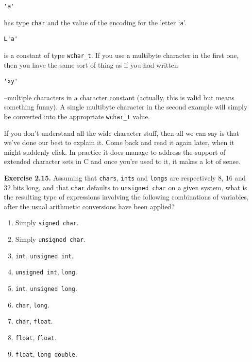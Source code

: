     \begin{Verbatim}
'a'
\end{Verbatim}

    has type \texttt{char} and the value of the encoding for the
     letter `\texttt{a}'.


    \begin{Verbatim}
L'a'
\end{Verbatim}

    is a constant of type \texttt{wchar\_t}. If you use a multibyte
     character in the first one, then you have the same sort of thing as if
     you had written


    \begin{Verbatim}
'xy'
\end{Verbatim}

    --multiple characters in a character constant (actually, this is
     valid but means something funny). A single multibyte character in the
     second example will simply be converted into the appropriate
     \texttt{wchar\_t} value.


    If you don't understand all the wide character stuff, then all we can
     say is that we've done our best to explain it. Come back and read it
     again later, when it might suddenly click. In practice it does manage to
     address the support of extended character sets in C and once you're
     used to it, it makes a lot of sense.


   

   

    \textbf{Exercise 2.15.} Assuming that \texttt{chars}, \texttt{ints} and
      \texttt{longs} are respectively 8, 16 and 32 bits
      long, and that \texttt{char} defaults to \texttt{unsigned char}
      on a given system, what is the resulting type of expressions involving
      the following combinations of variables, after the usual arithmetic
      conversions have been applied?

\begin{enumerate}
      \item Simply \texttt{signed char}.
      \item Simply \texttt{unsigned char}.
      \item \texttt{int}, \texttt{unsigned int}.
      \item \texttt{unsigned int}, \texttt{long}.
      \item \texttt{int}, \texttt{unsigned long}.
      \item \texttt{char}, \texttt{long}.
      \item \texttt{char}, \texttt{float}.
      \item \texttt{float}, \texttt{float}.
      \item \texttt{float}, \texttt{long double}.
     \end{enumerate}

